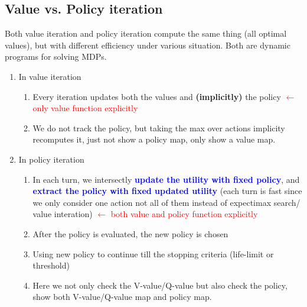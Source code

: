 \subsection{Value vs. Policy iteration}
Both value iteration and policy iteration compute the same thing (all optimal values), but with different efficiency under various situation. Both are dynamic programs for solving MDPs.
\begin{enumerate}
    \item In value iteration
    \begin{enumerate}
        \item Every iteration updates both the values and \textbf{(implicitly)} the policy \textcolor{red}{$\leftarrow$ only value function explicitly}
        \item We do not track the policy, but taking the max over actions implicity recomputes it, just not show a policy map, only show a value map. 
    \end{enumerate}
    \item In policy iteration
    \begin{enumerate}
        \item In each turn, we intersectly \textcolor{blue}{\textbf{update the utility with fixed policy}}, and \textcolor{blue}{\textbf{extract the policy with fixed updated utility}} (each turn is fast since we only consider one action not all of them instead of expectimax search/ value interation) \textcolor{red}{$\leftarrow$ both value and policy function explicitly}
        \item After the policy is evaluated, the new policy is chosen
        \item Using new policy to continue till the stopping criteria (life-limit or threshold)
        \item Here we not only check the V-value/Q-value but also check the policy, show both V-value/Q-value map and policy map.
    \end{enumerate}
\end{enumerate}

